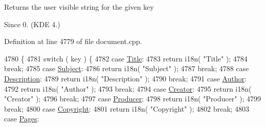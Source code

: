 Returns the user visible string for the given key \begin{DoxySince}{Since}
0. (K\+D\+E 4.) 
\end{DoxySince}


Definition at line 4779 of file document.\+cpp.


\begin{DoxyCode}
4780 \{
4781     \textcolor{keywordflow}{switch} ( key ) \{
4782         \textcolor{keywordflow}{case} \hyperlink{classOkular_1_1DocumentInfo_a3a6e5f7fb246e29bcb2e830b6f770791ae400626d63f14b61c55bd22aca9481e0}{Title}:
4783             \textcolor{keywordflow}{return} i18n( \textcolor{stringliteral}{"Title"} );
4784             \textcolor{keywordflow}{break};
4785         \textcolor{keywordflow}{case} \hyperlink{classOkular_1_1DocumentInfo_a3a6e5f7fb246e29bcb2e830b6f770791a19478a99f97624500aa2d050fe7e1ad8}{Subject}:
4786             \textcolor{keywordflow}{return} i18n( \textcolor{stringliteral}{"Subject"} );
4787             \textcolor{keywordflow}{break};
4788         \textcolor{keywordflow}{case} \hyperlink{classOkular_1_1DocumentInfo_a3a6e5f7fb246e29bcb2e830b6f770791acc3edf1d2abe6eecb0882f4389475591}{Description}:
4789             \textcolor{keywordflow}{return} i18n( \textcolor{stringliteral}{"Description"} );
4790             \textcolor{keywordflow}{break};
4791         \textcolor{keywordflow}{case} \hyperlink{classOkular_1_1DocumentInfo_a3a6e5f7fb246e29bcb2e830b6f770791a1010574d070b1925e030c20fef3e7a35}{Author}:
4792             \textcolor{keywordflow}{return} i18n( \textcolor{stringliteral}{"Author"} );
4793             \textcolor{keywordflow}{break};
4794         \textcolor{keywordflow}{case} \hyperlink{classOkular_1_1DocumentInfo_a3a6e5f7fb246e29bcb2e830b6f770791ab361aa9681b157d8d81e52f440bf646f}{Creator}:
4795             \textcolor{keywordflow}{return} i18n( \textcolor{stringliteral}{"Creator"} );
4796             \textcolor{keywordflow}{break};
4797         \textcolor{keywordflow}{case} \hyperlink{classOkular_1_1DocumentInfo_a3a6e5f7fb246e29bcb2e830b6f770791a4781bb7ac85d4fe7bdc448097aa1c48c}{Producer}:
4798             \textcolor{keywordflow}{return} i18n( \textcolor{stringliteral}{"Producer"} );
4799             \textcolor{keywordflow}{break};
4800         \textcolor{keywordflow}{case} \hyperlink{classOkular_1_1DocumentInfo_a3a6e5f7fb246e29bcb2e830b6f770791a54b1ae59c56cd90e64b518e4d729471a}{Copyright}:
4801             \textcolor{keywordflow}{return} i18n( \textcolor{stringliteral}{"Copyright"} );
4802             \textcolor{keywordflow}{break};
4803         \textcolor{keywordflow}{case} \hyperlink{classOkular_1_1DocumentInfo_a3a6e5f7fb246e29bcb2e830b6f770791ac4706afb6f17aac2a6da24699cbd7360}{Pages}:

\end{DoxyCode}
